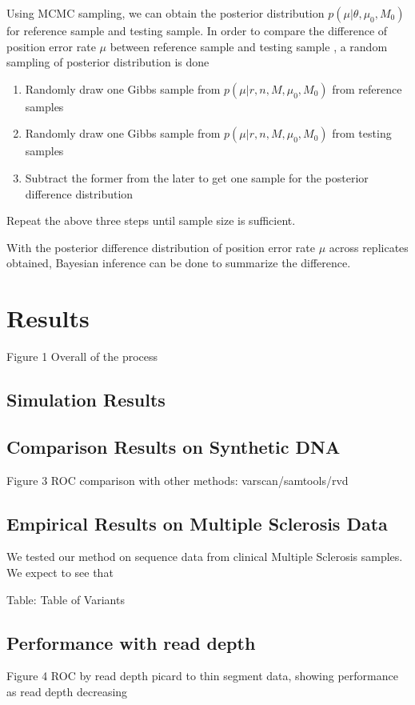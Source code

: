 \documentclass[11pt,reqno]{amsart}
\begin{document}
Using MCMC sampling, we can obtain the posterior distribution $p \left( \mu |\theta,\mu_0,M_0\right)$ for reference sample and testing sample. In order to compare the difference of position error rate $\mu$ between reference sample and testing sample , a random sampling of posterior distribution is done 

\begin{enumerate}
 \item Randomly  draw one Gibbs sample from $p \left( \mu |r, n, M, \mu_0, M_0\right)$ from reference samples
 \item Randomly draw one Gibbs sample from $p \left( \mu |r, n, M, \mu_0,M_0\right) $ from testing samples
 \item Subtract the former from the later to get one sample for the posterior difference distribution 
\end{enumerate}
Repeat the above three steps until sample size is sufficient.

With the posterior difference distribution of position error rate $\mu$ across replicates obtained, Bayesian inference can be done to summarize the difference. 


\section{Results}
Figure 1 Overall of the process
\subsection{Simulation Results}
\subsection{Comparison Results on Synthetic DNA}
Figure 3 ROC comparison with other methods: varscan/samtools/rvd
\subsection{Empirical Results on Multiple Sclerosis Data}
We tested our method on sequence data from clinical Multiple Sclerosis samples. We expect to see that 

Table: Table of Variants
\subsection{Performance with read depth}
Figure 4 ROC by read depth
picard to thin segment data, showing performance as read depth decreasing
\end{document}
